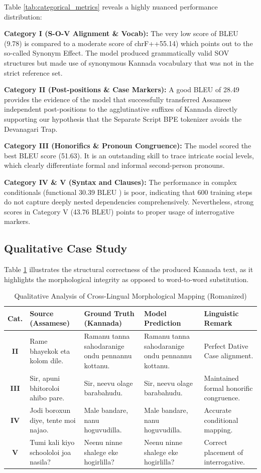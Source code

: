 \documentclass[conference]{IEEEtran}
\begin{document}
Table \ref{tab:categorical_metrics} reveals a highly nuanced performance distribution:

\textbf{Category I (S-O-V Alignment \& Vocab):} The very low score of BLEU (9.78) is compared to a moderate score of chrF++55.14) which points out to the so-called Synonym Effect. The model produced grammatically valid SOV structures but made use of synonymous Kannada vocabulary that was not in the strict reference set.

\textbf{Category II (Post-positions \& Case Markers):} A good BLEU of 28.49 provides the evidence of the model that successfully transferred Assamese independent post-positions to the agglutinative suffixes of Kannada directly supporting our hypothesis that the Separate Script BPE tokenizer avoids the Devanagari Trap.

\textbf{Category III (Honorifics \& Pronoun Congruence):} The model scored the best BLEU score (51.63). It is an outstanding skill to trace intricate social levels, which clearly differentiate formal and informal second-person pronouns.

\textbf{Category IV \& V (Syntax and Clauses):} The performance in complex conditionals (functional 30.39 BLEU ) is poor, indicating that 600 training steps do not capture deeply nested dependencies comprehensively. Nevertheless, strong scores in Category V (43.76 BLEU) points to proper usage of interrogative markers.

\subsection{Qualitative Case Study}
Table \ref{tab:qualitative_analysis} illustrates the structural correctness of the produced Kannada text, as it highlights the morphological integrity as opposed to word-to-word substitution.

\begin{table}[t]
\caption{Qualitative Analysis of Cross-Lingual Morphological Mapping (Romanized)}
\label{tab:qualitative_analysis}
\centering
\begin{tabular}{|c|p{4cm}|p{4cm}|p{4cm}|p{2.5cm}|}
\hline
\textbf{Cat.} & \textbf{Source (Assamese)} & \textbf{Ground Truth (Kannada)} & \textbf{Model Prediction} & \textbf{Linguistic Remark} \\ \hline
\textbf{II} & Rame bhayekok eta kolom dile. & Ramanu tanna sahodaranige ondu pennannu kottanu. & Ramanu tanna sahodaranige ondu pennannu kottanu. & Perfect Dative Case alignment. \\ \hline
\textbf{III} & Sir, apuni bhitoroloi ahibo pare. & Sir, neevu olage barabahudu. & Sir, neevu olage barabahudu. & Maintained formal honorific congruence. \\ \hline
\textbf{IV} & Jodi boroxun diye, tente moi najao. & Male bandare, nanu hoguvudilla. & Male bandare, nanu hoguvudilla. & Accurate conditional mapping. \\ \hline
\textbf{V} & Tumi kali kiyo schoololoi joa nasila? & Neenu ninne shalege eke hogirlilla? & Neenu ninne shalege eke hogirlilla? & Correct placement of interrogative. \\ \hline
\end{tabular}
\end{table}
\end{document}
